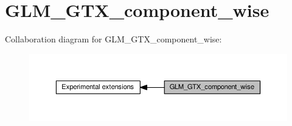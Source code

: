 \hypertarget{group__gtx__component__wise}{}\section{G\+L\+M\+\_\+\+G\+T\+X\+\_\+component\+\_\+wise}
\label{group__gtx__component__wise}
Collaboration diagram for G\+L\+M\+\_\+\+G\+T\+X\+\_\+component\+\_\+wise\+:
\nopagebreak
\begin{figure}[H]
\begin{center}
\leavevmode
\includegraphics[width=350pt]{dd/d66/group__gtx__component__wise}
\end{center}
\end{figure}
